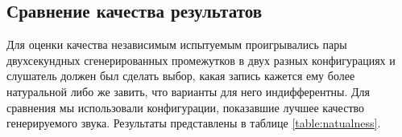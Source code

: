 \documentclass[../diploma.tex]{subfiles}
\begin{document}


\subsection{Сравнение качества результатов}
Для оценки качества независимым испытуемым проигрывались пары двухсекундных сгенерированных промежутков в двух разных конфигурациях и слушатель должен был сделать выбор, какая запись кажется ему более натуральной либо же завить, что варианты для него индифферентны.
Для сравнения мы использовали конфигурации, показавшие лучшее качество генерируемого звука.
Результаты представлены в таблице \ref{table:natualness}.

\end{document}
